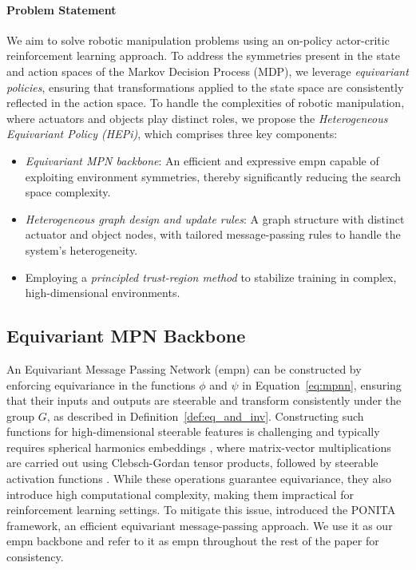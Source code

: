 \paragraph{Problem Statement} We aim to solve robotic manipulation problems using an on-policy actor-critic reinforcement learning approach. To address the symmetries present in the state and action spaces of the Markov Decision Process (MDP), we leverage \textit{equivariant policies}, ensuring that transformations applied to the state space are consistently reflected in the action space. To handle the complexities of robotic manipulation, where actuators and objects play distinct roles, we propose the \emph{Heterogeneous Equivariant Policy (HEPi)}, which comprises three key components:
\begin{itemize}
    \item \textit{Equivariant MPN backbone}: An efficient and expressive \gls{empn} capable of exploiting environment symmetries, thereby significantly reducing the search space complexity.
    \item \textit{Heterogeneous graph design and update rules}: A graph structure with distinct actuator and object nodes, with tailored message-passing rules to handle the system's heterogeneity.
    \item Employing a \emph{principled trust-region method} to stabilize training in complex, high-dimensional environments.
\end{itemize}


\subsection{Equivariant MPN Backbone}

An Equivariant Message Passing Network (\gls{empn}) can be constructed \citep{brandstetter2022geometric, duval2023hitchhikers, bekkers2024fast} by enforcing equivariance in the functions $\phi$ and $\psi$ in Equation~\ref{eq:mpnn}, ensuring that their inputs and outputs are steerable and transform consistently under the group $G$, as described in Definition~\ref{def:eq_and_inv}. Constructing such functions for high-dimensional steerable features is challenging and typically requires spherical harmonics embeddings \citep{duval2023hitchhikers}, where matrix-vector multiplications are carried out using Clebsch-Gordan tensor products, followed by steerable activation functions \citep{brandstetter2022geometric, bekkers2024fast}. While these operations guarantee equivariance, they also introduce high computational complexity, making them impractical for reinforcement learning settings. To mitigate this issue, \citet{bekkers2024fast} introduced the PONITA framework, an efficient equivariant message-passing approach. We use it as our \gls{empn} backbone and refer to it as \gls{empn} throughout the rest of the paper for consistency.

